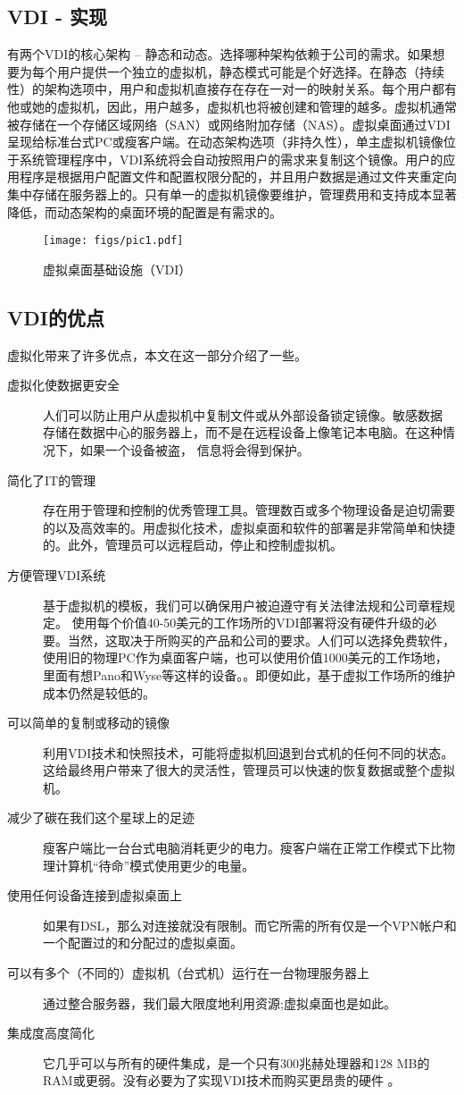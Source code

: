 \documentclass[10pt,a4paper]{article}
\begin{document}
\begin{CJK*}{UTF8}{gkai}
\subsection{VDI - 实现}
有两个VDI的核心架构 – 静态和动态。选择哪种架构依赖于公司的需求。如果想要为每个用户提供一个独立的虚拟机，静态模式可能是个好选择。在静态（持续性）的架构选项中，用户和虚拟机直接存在存在一对一的映射关系。每个用户都有他或她的虚拟机，因此，用户越多，虚拟机也将被创建和管理的越多。虚拟机通常被存储在一个存储区域网络（SAN）或网络附加存储（NAS）。虚拟桌面通过VDI呈现给标准台式PC或瘦客户端。在动态架构选项（非持久性​​），单主虚拟机镜像位于系统管理程序中，VDI系统将会自动按照用户的需求来复制这个镜像。用户的应用程序是根据用户配置文件和配置权限分配的，并且用户数据是通过文件夹重定向集中存储在服务器上的。只有单一的虚拟机镜像要维护，管理费用和支持成本显著降低，而动态架构的桌面环境的配置是有需求的。 
\begin{figure}[!htbp]
	\centering
	\caption{虚拟桌面基础设施（VDI）}
    	\texttt{[image: figs/pic1.pdf]}
    \label{fig:subfig4}
\end{figure}

\subsection{VDI的优点}
虚拟化带来了许多优点，本文在这一部分介绍了一些。
\begin{description}
\item[虚拟化使数据更安全] 人们可以防止用户从虚拟机中复制文件或从外部设备锁定镜像。敏感数据 
存储在数据中心的服务器上，而不是在远程设备上像笔记本电脑。在这种情况下，如果一个设备被盗， 
信息将会得到保护。 
\item[简化了IT的管​​理]  存在用于管理和控制的优秀管理工具。管理数百或多个物理设备是迫切需要的以及高效率的。用虚拟化技术，虚拟桌面和软件的部署是非常简单和快捷的。此外，管理员可以远程启动，停止和控制虚拟机。 
\item[方便管理VDI系统]  基于虚拟机的模板，我们可以确保用户被迫遵守有关法律法规和公司章程规定。
使用每个价值40-50美元的工作场所的VDI部署将没有硬件升级的必要。当然，这取决于所购买的产品和公司的要求。人们可以选择免费软件，使用旧的物理PC作为桌面客户端，也可以使用价值1000美元的工作场地，里面有想Pano和Wyse等这样的设备。。即便如此，基于虚拟工作场所的维护成本仍然是较低的。 
\item[可以简单的复制或移动的镜像]  利用VDI技术和快照技术，可能将虚拟机回退到台式机的任何不同的状态。这给最终用户带来了很大的灵活性，管理员可以快速的恢复数据或整个虚拟机。
\item[减少了碳在我们这个星球上的足迹\cite{14}]  瘦客户端比一台台式电脑消耗更少的电力。瘦客户端在正常工作模式下比物理计算机“待命”模式使用更少的电量。 
\item[使用任何设备连接到虚拟桌面上]  如果有DSL，那么对连接就没有限制。而它所需的所有仅是一个VPN帐户和一个配置过的和分配过的虚拟桌面。 
\item[可以有多个（不同的）虚拟机（台式机）运行在一台物理服务器上] 通过整合服务器，我们最大限度地利用资源;虚拟桌面也是如此。 
\item[集成度高度简化]  它几乎可以与所有的硬件集成，是一个只有300兆赫处理器和128 MB的RAM或更弱。没有必要为了实现VDI技术而购买更昂贵的硬件 。 
\end{description}



\end{CJK*}
\end{document}
